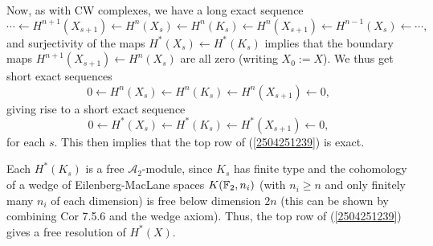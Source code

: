 \documentclass{MetricNotes2023}
\def\bb{\ensuremath\mathbb}
\def\A{\ensuremath{\mathscr{A}_2}}
\begin{document}
Now, as with CW complexes, we have a long exact sequence
\[\cdots \leftarrow H^{n+1}(X_{s+1})\leftarrow H^n(X_{s})\leftarrow H^n(K_s)\leftarrow H^n(X_{s+1})\leftarrow H^{n-1}(X_s)\leftarrow \cdots,\]
and surjectivity of the maps \(H^*(X_s)\leftarrow H^*(K_s)\) implies that the boundary maps \(H^{n+1}(X_{s+1})\leftarrow H^n(X_s)\) are all zero (writing \(X_0:=X\)). We thus get short exact sequences
\[0\leftarrow H^n(X_{s})\leftarrow H^n(K_s)\leftarrow H^n(X_{s+1})\leftarrow0,\]
giving rise to a short exact sequence
\[0\leftarrow H^*(X_{s})\leftarrow H^*(K_s)\leftarrow H^*(X_{s+1})\leftarrow0,\]
for each \(s\). This then implies that the top row of (\ref{2504251239}) is exact.

Each \(H^*(K_s)\) is a free \(\A\)-module, since \(K_s\) has finite type and the cohomology of a wedge of Eilenberg-MacLane spaces \(K(\bb{F}_2, n_i)\) (with \(n_i \geq n\) and only finitely many \(n_i\) of each dimension) is free below dimension \(2n\) (this can be shown by combining \autocite{rognes2} Cor 7.5.6 and the wedge axiom). Thus, the top row of (\ref{2504251239}) gives a free resolution of \(H^*(X)\). 

\end{document}
